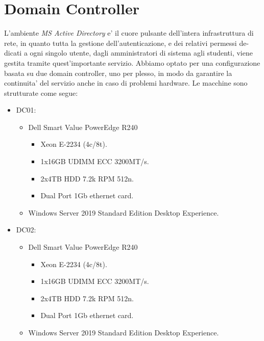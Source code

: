 \documentclass{report}
\begin{document}
		\section{Domain Controller}
			L'ambiente \emph{MS Active Directory} e' il cuore pulsante dell'intera infrastruttura di rete, in quanto tutta 
			la gestione dell'autenticazione, e dei relativi permessi de-\\dicati a ogni singolo utente, dagli amministratori
			di sistema agli studenti, viene gestita tramite quest'importante servizio.
			Abbiamo optato per una configurazione basata su due domain controller, uno per plesso, in modo da garantire la
			continuita' del servizio anche in caso di problemi hardware.
			Le macchine sono strutturate come segue:
			\begin{itemize}
				\item DC01:
					\begin{itemize}
						\item Dell Smart Value PowerEdge R240
							\begin{itemize}
								\item Xeon E-2234 (4c/8t).
								\item 1x16GB UDIMM ECC 3200MT/s.
								\item 2x4TB HDD 7.2k RPM 512n.
								\item Dual Port 1Gb ethernet card.
							\end{itemize}
						\item Windows Server 2019 Standard Edition Desktop Experience.
					\end{itemize}\newpage
				\item DC02: 
					\begin{itemize}
						\item Dell Smart Value PowerEdge R240
							\begin{itemize}
								\item Xeon E-2234 (4c/8t).
								\item 1x16GB UDIMM ECC 3200MT/s.
								\item 2x4TB HDD 7.2k RPM 512n.
								\item Dual Port 1Gb ethernet card.
							\end{itemize}
						\item Windows Server 2019 Standard Edition Desktop Experience.
					\end{itemize}
			\end{itemize}
\end{document}
